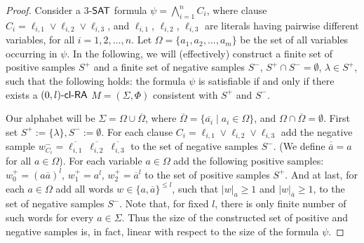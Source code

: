 \begin{proof}
Consider a $3$-$\textup{\sf SAT}$ formula $\psi = \bigwedge_{i=1}^n C_i$, where clause $C_i = \ell_{i,1} \vee \ell_{i,2} \vee \ell_{i,3}$, and $\ell_{i,1}$, $\ell_{i,2}$,  $\ell_{i,3}$ are literals having pairwise different variables, for all  $i = 1, 2, \ldots, n$. Let $\Omega = \{a_1, a_2, \ldots, a_m\}$ be the set of all variables occurring in $\psi$. In the following, we will (effectively) construct a finite set of positive samples $S^+$ and a finite set of negative samples $S^-$, $S^+ \cap S^- = \emptyset$, $\lambda \in S^+$, such that the following holds: the formula $\psi$ is satisfiable if and only if there exists a $\textup{\sf $(0,l)$-\textup{\sf cl-RA\/}}$ $M = (\Sigma, \Phi)$ consistent with $S^+$ and $S^-$.

Our alphabet will be $\Sigma = \Omega \cup \overline{\Omega}$, where $\overline{\Omega} = \{ \overline{a_i} \mid a_i \in \Omega \}$, and $\Omega \cap \overline{\Omega} = \emptyset$. First set $S^+ := \{ \lambda \}, S^- := \emptyset$. For each clause $C_i = \ell_{i,1} \vee \ell_{i,2} \vee \ell_{i,3}$ add the negative sample $w_{C_i}^- = \overline{\ell_{i,1}}\ \overline{\ell_{i,2}}\ \overline{\ell_{i,3}}$ to the set of negative samples $S^-$. (We define $\overline{\overline{a}} = a$ for all $a \in \Omega$). For each variable $a \in \Omega$ add the following positive samples: $w_0^+ = (a \overline{a})^l$, $w_1^+ = a^l$, $w_2^+ = \overline{a}^l$ to the set of positive samples $S^+$. And at last, for each $a \in \Omega$ add all words $w \in \{a, \overline{a}\}^{\le l}$, such that $|w|_a \ge 1$ and $|w|_{\overline{a}} \ge 1$, to the set of negative samples $S^-$. Note that, for fixed $l$, there is only finite number of such words for every $a \in \Sigma$. Thus the size of the constructed set of positive and negative samples is, in fact, linear with respect to the size of the formula $\psi$.


\end{proof}
